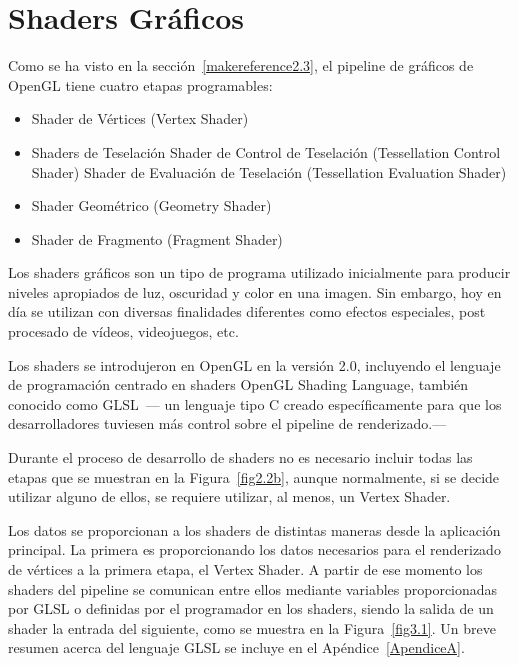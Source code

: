 \cleardoublepage

\chapter{Shaders Gráficos}
\label{makereference3}

Como se ha visto en la sección~\ref{makereference2.3}, el pipeline de gráficos
de OpenGL tiene cuatro etapas programables:

\begin{itemize}
		\item Shader de Vértices (Vertex Shader)
		\item Shaders de Teselación
				\subitem Shader de Control de Teselación (Tessellation Control
				Shader)
				\subitem Shader de Evaluación de Teselación (Tessellation
				Evaluation Shader)
		\item Shader Geométrico (Geometry Shader)
		\item Shader de Fragmento (Fragment Shader)
\end{itemize}

Los shaders gráficos son un tipo de programa utilizado inicialmente para
producir niveles apropiados de luz, oscuridad y color en una imagen. Sin
embargo, hoy en día se utilizan con diversas finalidades diferentes como efectos
especiales, post procesado de vídeos, videojuegos, etc.

Los shaders se introdujeron en OpenGL en la versión 2.0, incluyendo el lenguaje
de programación centrado en shaders OpenGL Shading Language, también conocido
como GLSL~\cite{GLSL}--- un lenguaje tipo C creado específicamente para que los
desarrolladores tuviesen más control sobre el pipeline de renderizado.---

Durante el proceso de desarrollo de shaders no es necesario incluir todas las
etapas que se muestran en la Figura~\ref{fig2.2b}, aunque normalmente, si se
decide utilizar alguno de ellos, se requiere utilizar, al menos, un Vertex
Shader. 

Los datos se proporcionan a los shaders de distintas maneras desde la aplicación
principal. La primera es proporcionando los datos necesarios para el renderizado
de vértices a la primera etapa, el Vertex Shader. A partir de ese momento los
shaders del pipeline se comunican entre ellos mediante variables proporcionadas
por GLSL o definidas por el programador en los shaders, siendo la salida de un
shader la entrada del siguiente, como se muestra en la Figura~\ref{fig3.1}. Un
breve resumen acerca del lenguaje GLSL se incluye en el
Apéndice~\ref{ApendiceA}. 

